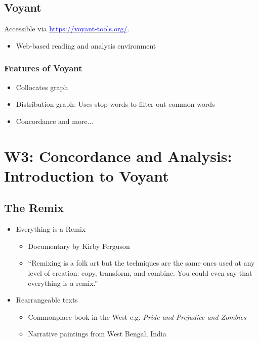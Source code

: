 \documentclass[a4paper]{article}
\begin{document}
\subsection{Voyant}
Accessible via \href{https://voyant-tools.org/}{\textcolor{blue}{https://voyant-tools.org/}}.
\begin{itemize}
    \item Web-based reading and analysis environment
\end{itemize}
\subsubsection{Features of Voyant}
\begin{itemize}[label=$\circ$]
    \item Collocates graph
    \item Distribution graph: Uses stop-words to filter out common words
    \item Concordance and more...
\end{itemize}

\newpage
\section{W3: Concordance and Analysis: Introduction to Voyant}
\subsection{The Remix}
\begin{itemize}
    \item Everything is a Remix
    \begin{itemize}[label=$\circ$]
        \item Documentary by Kirby Ferguson
        \item ``Remixing is a folk art but the techniques are the same ones used at any level of creation: copy, transform, and combine. You could even say that everything is a remix.''
    \end{itemize}
    \item Rearrangeable texts
    \begin{itemize}[label=$\circ$]
        \item Commonplace book in the West e.g. \textit{Pride and Prejudice and Zombies}
        \item Narrative paintings from West Bengal, India
    \end{itemize} 
\end{itemize}
\end{document}
